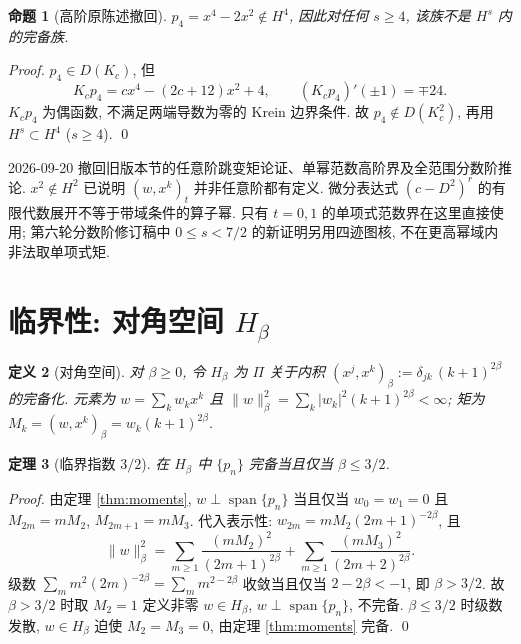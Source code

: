 \documentclass[UTF8]{ctexart}
\newtheorem{theorem}{定理}[section]
\newtheorem{proposition}[theorem]{命题}
\newtheorem{definition}[theorem]{定义}
\begin{document}
\begin{proposition}[高阶原陈述撤回]
$p_4=x^4-2x^2\notin H^4$, 因此对任何 $s\ge4$, 该族不是 $H^s$ 内的完备族.
\end{proposition}
\begin{proof}
$p_4\in D(K_c)$, 但
\[
 K_cp_4=cx^4-(2c+12)x^2+4,\qquad (K_cp_4)'(\pm1)=\mp24.
\]
$K_cp_4$ 为偶函数, 不满足两端导数为零的 Krein 边界条件.
故 $p_4\notin D(K_c^2)$, 再用 $H^s\subset H^4$ ($s\ge4$). \qed
\end{proof}

2026-09-20 撤回旧版本节的任意阶跳变矩论证、单幂范数高阶界及全范围分数阶推论.
$x^2\notin H^2$ 已说明 $(w,x^k)_t$ 并非任意阶都有定义.
微分表达式 $(c-D^2)^r$ 的有限代数展开不等于带域条件的算子幂.
只有 $t=0,1$ 的单项式范数界在这里直接使用; 第六轮分数阶修订稿中 $0\le s<7/2$ 的新证明另用四迹图核, 不在更高幂域内非法取单项式矩.

\section{临界性: 对角空间 \texorpdfstring{$H_\beta$}{H beta}}

\begin{definition}[对角空间]
	对 $\beta \geq 0$, 令 $H_\beta$ 为 $\Pi$ 关于内积
	$(x^j, x^k)_\beta := \delta_{jk}\, (k+1)^{2\beta}$ 的完备化. 元素为
	$w = \sum_k w_k x^k$ 且 $\|w\|_\beta^2 = \sum_k |w_k|^2 (k+1)^{2\beta}
	< \infty$; 矩为 $M_k = (w, x^k)_\beta = w_k (k+1)^{2\beta}$.
\end{definition}

\begin{theorem}[临界指数 $3/2$]\label{thm:diagonal}
	在 $H_\beta$ 中 $\{p_n\}$ 完备当且仅当 $\beta \leq 3/2$.
\end{theorem}

\begin{proof}
	由定理 \ref{thm:moments}, $w \perp \operatorname{span}\{p_n\}$ 当且仅当 $w_0 = w_1 = 0$
	且 $M_{2m} = mM_2$, $M_{2m+1} = mM_3$. 代入表示性:
	$w_{2m} = mM_2 (2m+1)^{-2\beta}$, 且
	\[
		\|w\|_\beta^2 = \sum_{m \geq 1} \frac{(mM_2)^2}{(2m+1)^{2\beta}}
			+ \sum_{m \geq 1} \frac{(mM_3)^2}{(2m+2)^{2\beta}} .
	\]
	级数 $\sum_m m^2 (2m)^{-2\beta} = \sum_m m^{2-2\beta}$ 收敛当且仅当
	$2 - 2\beta < -1$, 即 $\beta > 3/2$. 故 $\beta > 3/2$ 时取 $M_2 = 1$
	定义非零 $w \in H_\beta$, $w \perp \operatorname{span}\{p_n\}$,
	不完备. $\beta \leq 3/2$ 时级数发散, $w \in H_\beta$ 迫使 $M_2 = M_3 = 0$,
	由定理 \ref{thm:moments} 完备. \qed
\end{proof}
\end{document}
